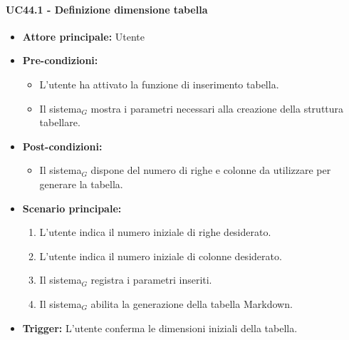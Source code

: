 \documentclass[a4paper, 10pt]{article}
\begin{document}
\paragraph{UC44.1 - Definizione dimensione tabella}
\begin{itemize}
    \item \textbf{Attore principale:} Utente
    \item \textbf{Pre-condizioni:}
        \begin{itemize}
            \item L'utente ha attivato la funzione di inserimento tabella.
            \item Il sistema$_G$ mostra i parametri necessari alla creazione della struttura tabellare.
        \end{itemize}
    \item \textbf{Post-condizioni:}
        \begin{itemize}
            \item Il sistema$_G$ dispone del numero di righe e colonne da utilizzare per generare la tabella.
        \end{itemize}
    \item \textbf{Scenario principale:}
        \begin{enumerate}
            \item L'utente indica il numero iniziale di righe desiderato.
            \item L'utente indica il numero iniziale di colonne desiderato.
            \item Il sistema$_G$ registra i parametri inseriti.
            \item Il sistema$_G$ abilita la generazione della tabella Markdown.
        \end{enumerate}
    \item \textbf{Trigger:} L'utente conferma le dimensioni iniziali della tabella.
\end{itemize}
\end{document}

